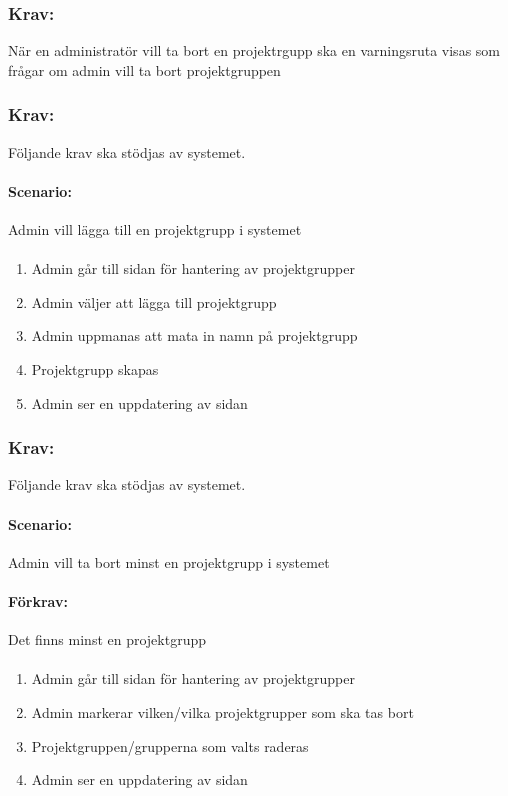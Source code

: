 \documentclass[paper=a4, fontsize=11pt,twoside]{article}
\begin{document}
\subsubsection{Krav:}
När en administratör vill ta bort en projektrgupp ska en varningsruta visas som frågar om admin vill ta bort projektgruppen

\subsubsection{Krav:} Följande krav ska stödjas av systemet.
\paragraph{Scenario:}
Admin vill lägga till en projektgrupp i systemet
\paragraph{}
\begin{enumerate}
\item Admin går till sidan för hantering av projektgrupper
\item Admin väljer att lägga till projektgrupp
\item Admin uppmanas att mata in namn på projektgrupp
\item Projektgrupp skapas
\item Admin ser en uppdatering av sidan
\end{enumerate}

\subsubsection{Krav:} 
Följande krav ska stödjas av systemet.
\paragraph{Scenario:}
Admin vill ta bort minst en projektgrupp i systemet
\paragraph{Förkrav:}
Det finns minst en projektgrupp
\paragraph{}
\begin{enumerate}
\item Admin går till sidan för hantering av projektgrupper
\item Admin markerar vilken/vilka projektgrupper som ska tas bort
\item Projektgruppen/grupperna som valts raderas
\item Admin ser en uppdatering av sidan
\end{enumerate}
\end{document}
